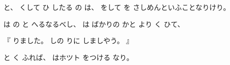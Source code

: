 と、
くして
ひ
したる
の
は、
をして
を
さしめんといふことなりけり。

は
の
と
へるなるべし、
は
ばかりの
かと
より
く
ひて、

『
りました。
しの
りに
しましやう。
』

と
く
ふれば、
はホツト
をつける
なり。

